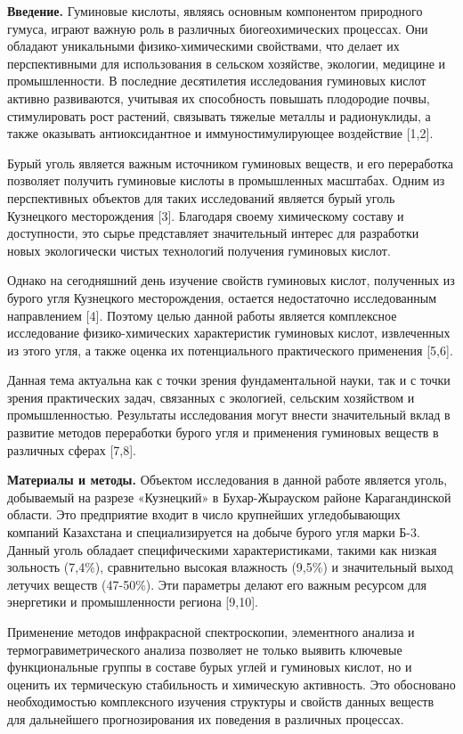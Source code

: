 \begin{multicols}{2}
{\bfseries Введение.} Гуминовые кислоты, являясь основным компонентом
природного гумуса, играют важную роль в различных биогеохимических
процессах. Они обладают уникальными физико-химическими свойствами, что
делает их перспективными для использования в сельском хозяйстве,
экологии, медицине и промышленности. В последние десятилетия
исследования гуминовых кислот активно развиваются, учитывая их
способность повышать плодородие почвы, стимулировать рост растений,
связывать тяжелые металлы и радионуклиды, а также оказывать
антиоксидантное и иммуностимулирующее воздействие {[}1,2{]}.

Бурый уголь является важным источником гуминовых веществ, и его
переработка позволяет получить гуминовые кислоты в промышленных
масштабах. Одним из перспективных объектов для таких исследований
является бурый уголь Кузнецкого месторождения {[}3{]}. Благодаря своему
химическому составу и доступности, это сырье представляет значительный
интерес для разработки новых экологически чистых технологий получения
гуминовых кислот.

Однако на сегодняшний день изучение свойств гуминовых кислот, полученных
из бурого угля Кузнецкого месторождения, остается недостаточно
исследованным направлением {[}4{]}. Поэтому целью данной работы является
комплексное исследование физико-химических характеристик гуминовых
кислот, извлеченных из этого угля, а также оценка их потенциального
практического применения {[}5,6{]}.

Данная тема актуальна как с точки зрения фундаментальной науки, так и с
точки зрения практических задач, связанных с экологией, сельским
хозяйством и промышленностью. Результаты исследования могут внести
значительный вклад в развитие методов переработки бурого угля и
применения гуминовых веществ в различных сферах {[}7,8{]}.

{\bfseries Материалы и методы.} Объектом исследования в данной работе
является уголь, добываемый на разрезе «Кузнецкий» в Бухар-Жырауском
районе Карагандинской области. Это предприятие входит в число крупнейших
угледобывающих компаний Казахстана и специализируется на добыче бурого
угля марки Б-3. Данный уголь обладает специфическими характеристиками,
такими как низкая зольность (7,4\%), сравнительно высокая влажность
(9,5\%) и значительный выход летучих веществ (47-50\%). Эти параметры
делают его важным ресурсом для энергетики и промышленности региона
{[}9,10{]}.

Применение методов инфракрасной спектроскопии, элементного анализа и
термогравиметрического анализа позволяет не только выявить ключевые
функциональные группы в составе бурых углей и гуминовых кислот, но и
оценить их термическую стабильность и химическую активность. Это
обосновано необходимостью комплексного изучения структуры и свойств
данных веществ для дальнейшего прогнозирования их поведения в различных
процессах.


\end{multicols}
